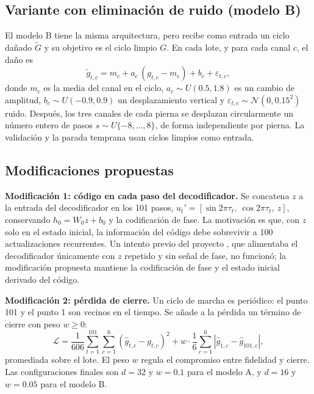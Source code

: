 \documentclass[11pt,a4paper]{amsart}
\begin{document}
\subsection{Variante con eliminación de ruido (modelo B)}
\label{sec:denoising}

El modelo B tiene la misma arquitectura, pero recibe como entrada un ciclo dañado $\tilde G$ y su objetivo es el ciclo limpio $G$. En cada lote, y para cada canal $c$, el daño es
\begin{equation}
\tilde g_{t,c}=m_c+a_c\,(g_{t,c}-m_c)+b_c+\varepsilon_{t,c},
\end{equation}
donde $m_c$ es la media del canal en el ciclo, $a_c\sim U(0.5,1.8)$ es un cambio de amplitud, $b_c\sim U(-0.9,0.9)$ un desplazamiento vertical y $\varepsilon_{t,c}\sim\mathcal N(0,0.15^2)$ ruido. Después, los tres canales de cada pierna se desplazan circularmente un número entero de pasos $s\sim U\{-8,\dots,8\}$, de forma independiente por pierna. La validación y la parada temprana usan ciclos limpios como entrada.

\subsection{Modificaciones propuestas}
\label{sec:mods}

\textbf{Modificación 1: código en cada paso del decodificador.} Se concatena $z$ a la entrada del decodificador en los 101 pasos, $u_t'=[\sin 2\pi\tau_t,\ \cos 2\pi\tau_t,\ z]$, conservando $h_0=W_0z+b_0$ y la codificación de fase. La motivación es que, con $z$ solo en el estado inicial, la información del código debe sobrevivir a 100 actualizaciones recurrentes. Un intento previo del proyecto \cite{neurostride2026}, que alimentaba el decodificador únicamente con $z$ repetido y sin señal de fase, no funcionó; la modificación propuesta mantiene la codificación de fase y el estado inicial derivado del código.

\textbf{Modificación 2: pérdida de cierre.} Un ciclo de marcha es periódico: el punto 101 y el punto 1 son vecinos en el tiempo. Se añade a la pérdida un término de cierre con peso $w\ge 0$:
\begin{equation}
\mathcal L=\frac{1}{606}\sum_{t=1}^{101}\sum_{c=1}^{6}(\hat g_{t,c}-g_{t,c})^2+w\cdot\frac16\sum_{c=1}^{6}\left|\hat g_{1,c}-\hat g_{101,c}\right| ,
\end{equation}
promediada sobre el lote. El peso $w$ regula el compromiso entre fidelidad y cierre. Las configuraciones finales son $d=32$ y $w=0.1$ para el modelo A, y $d=16$ y $w=0.05$ para el modelo B.
\end{document}
